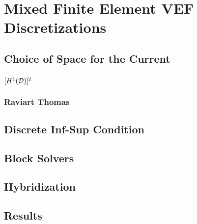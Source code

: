 \documentclass[../doc.tex]{subfiles}
\begin{document}
\chapter{Mixed Finite Element VEF Discretizations}

\section{Choice of Space for the Current}
\subsection{$[H^1(\mathcal{D})]^2$}
\subsection{Raviart Thomas}
\section{Discrete Inf-Sup Condition}
\section{Block Solvers}
\section{Hybridization}
\section{Results}

\begin{table}
\centering
\caption{}
\label{}

\end{table}

\begin{table}
\centering
\caption{}
\label{}

\end{table}

\begin{table}
\centering
\caption{}
\label{}

\end{table}


\begin{table}
\centering
\caption{}
\label{}

\end{table}

\begin{table}
\centering
\caption{}
\label{}

\end{table}

\begin{table}
\centering
\caption{}
\label{}
\begin{adjustbox}{max width=\textwidth}

\end{adjustbox}
\end{table}

\begin{table}
\centering
\caption{}
\label{}

\end{table}
\end{document}
